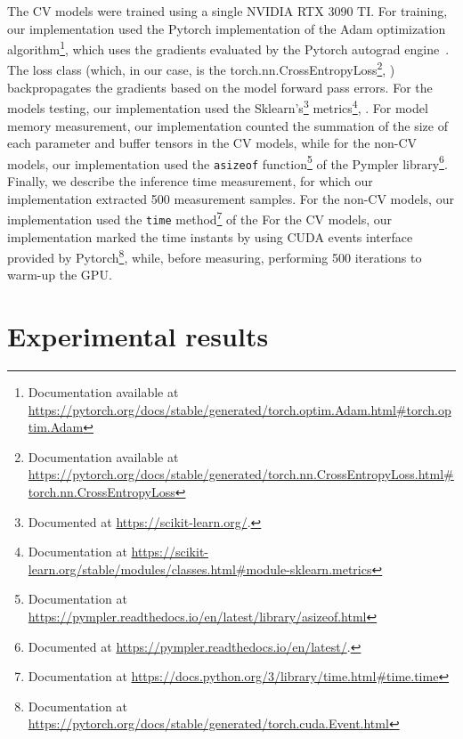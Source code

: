 The \gls{CV} models were trained using a single NVIDIA RTX 3090 TI. For training, our implementation used the Pytorch implementation of the Adam optimization algorithm\footnote{Documentation available at \url{https://pytorch.org/docs/stable/generated/torch.optim.Adam.html\#torch.optim.Adam}}, which uses the gradients evaluated by the Pytorch autograd engine~\cite{Pytorch}. The loss class (which, in our case, is the torch.nn.CrossEntropyLoss\footnote{Documentation available at \url{https://pytorch.org/docs/stable/generated/torch.nn.CrossEntropyLoss.html\#torch.nn.CrossEntropyLoss}}, ) backpropagates the gradients based on the model forward pass errors. For the models testing, our implementation used the Sklearn's\footnote{Documented at \url{https://scikit-learn.org/}.} metrics\footnote{Documentation at \url{https://scikit-learn.org/stable/modules/classes.html\#module-sklearn.metrics}}, . For model memory measurement, our implementation counted the summation of the size of each parameter and buffer tensors in the \gls{CV} models, while for the non-\gls{CV} models, our implementation used the \texttt{asizeof} function\footnote{Documentation at \url{https://pympler.readthedocs.io/en/latest/library/asizeof.html}} of the Pympler library\footnote{Documented at \url{https://pympler.readthedocs.io/en/latest/}.}. Finally, we describe the inference time measurement, for which our implementation extracted 500 measurement samples. For the non-\gls{CV} models, our implementation used the \texttt{time} method\footnote{Documentation at \url{https://docs.python.org/3/library/time.html\#time.time}} of the  For the \gls{CV} models, our implementation marked the time instants by using CUDA events interface provided by Pytorch\footnote{Documentation at \url{https://pytorch.org/docs/stable/generated/torch.cuda.Event.html}}, while, before measuring, performing 500 iterations to warm-up the GPU. 

\section{Experimental results}


